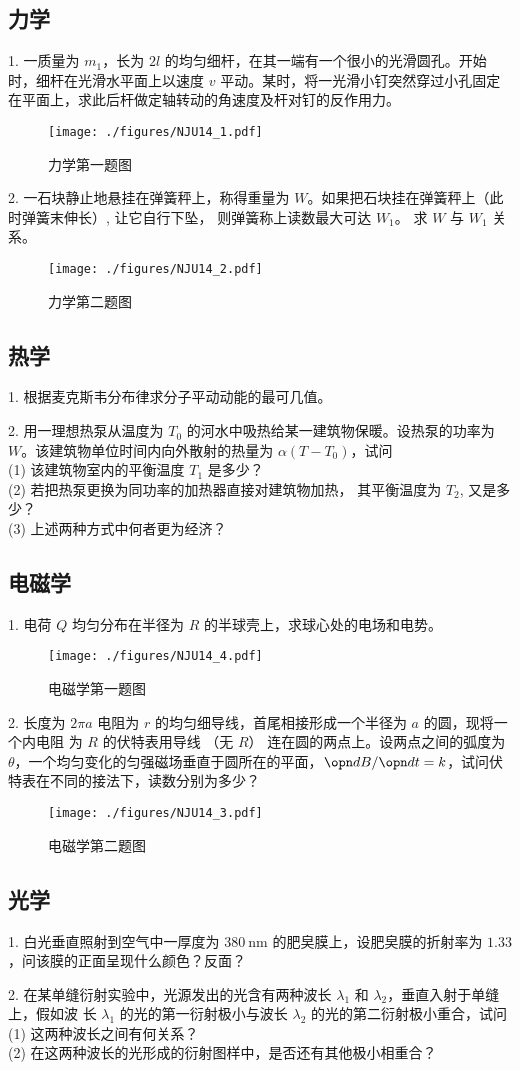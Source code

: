 \subsection{力学}
1. 一质量为 $m_{1}$，长为 $2l$ 的均匀细杆，在其一端有一个很小的光滑圆孔。开始时，细杆在光滑水平面上以速度 $v$ 平动。某时，将一光滑小钉突然穿过小孔固定在平面上，求此后杆做定轴转动的角速度及杆对钉的反作用力。
\begin{figure}[ht]
\centering
\texttt{[image: ./figures/NJU14\_1.pdf]}
\caption{力学第一题图} \label{NJU14_fig1}
\end{figure}
2. 一石块静止地悬挂在弹簧秤上，称得重量为 $W$。如果把石块挂在弹簧秤上（此时弹簧末伸长）, 让它自行下坠， 则弹簧称上读数最大可达 $W_{1}$。 求 $W$ 与 $W_{1}$ 关系。
\begin{figure}[ht]
\centering
\texttt{[image: ./figures/NJU14\_2.pdf]}
\caption{力学第二题图} \label{NJU14_fig2}
\end{figure}
\subsection{热学}
1. 根据麦克斯韦分布律求分子平动动能的最可几值。

2. 用一理想热泵从温度为 $T_{0}$ 的河水中吸热给某一建筑物保暖。设热泵的功率为 $W$。该建筑物单位时间内向外散射的热量为 $\alpha\left(T-T_{0}\right)$，试问\\
(1) 该建筑物室内的平衡温度 $T_{1}$ 是多少？\\
(2) 若把热泵更换为同功率的加热器直接对建筑物加热， 其平衡温度为 $T_{2}$, 又是多少？\\
(3) 上述两种方式中何者更为经济？\\
\subsection{电磁学}
1. 电荷 $Q$ 均匀分布在半径为 $R$ 的半球壳上，求球心处的电场和电势。
\begin{figure}[ht]
\centering
\texttt{[image: ./figures/NJU14\_4.pdf]}
\caption{电磁学第一题图} \label{NJU14_fig4}
\end{figure}
2. 长度为 $2 \pi a$ 电阻为 $r$ 的均匀细导线，首尾相接形成一个半径为 $a$ 的圆，现将一个内电阻 为 $R$ 的伏特表用导线 （无 $R$） 连在圆的两点上。设两点之间的弧度为 $\theta$，一个均匀变化的匀强磁场垂直于圆所在的平面，$\opn dB/\opn dt =k$，试问伏特表在不同的接法下，读数分别为多少？
\begin{figure}[ht]
\centering
\texttt{[image: ./figures/NJU14\_3.pdf]}
\caption{电磁学第二题图} \label{NJU14_fig3}
\end{figure}
\subsection{光学}
1. 白光垂直照射到空气中一厚度为 $380 \mathrm{~nm}$ 的肥㚖膜上，设肥㚖膜的折射率为 $1.33$，问该膜的正面呈现什么颜色？反面？

2. 在某单缝衍射实验中，光源发出的光含有两种波长 $\lambda_{1}$ 和 $\lambda_{2}$，垂直入射于单缝上，假如波 长 $\lambda_{1}$ 的光的第一衍射极小与波长 $\lambda_{2}$ 的光的第二衍射极小重合，试问\\
(1) 这两种波长之间有何关系？\\
(2) 在这两种波长的光形成的衍射图样中，是否还有其他极小相重合？